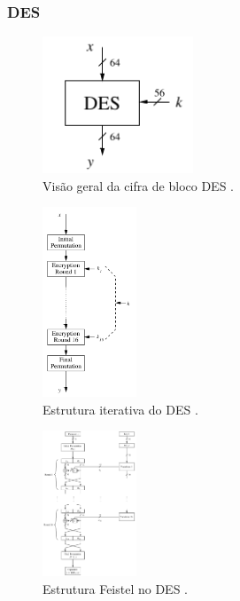 \begin{frame}[allowframebreaks]
\frametitle{DES}

\begin{figure}[h]
\centering
\includegraphics[width=0.4\textwidth,height=0.4\textheight,keepaspectratio]{figures/DES01.png}
\caption{Visão geral da cifra de bloco DES \cite{paar2014}.}
\label{fig-DES01}
\end{figure}

 \framebreak

\begin{figure}[h]
\centering
\includegraphics[width=0.25\textwidth,height=0.75\textheight,keepaspectratio]{figures/DES02.png}
\caption{Estrutura iterativa do DES \cite{paar2014}.}
\label{fig-DES02}
\end{figure}

 \framebreak

\begin{figure}[h]
\centering
\includegraphics[width=0.25\textwidth,height=0.75\textheight,keepaspectratio]{figures/DES03.png}
\caption{Estrutura Feistel no DES \cite{paar2014}.}
\label{fig-DES03}
\end{figure}


\end{frame}
